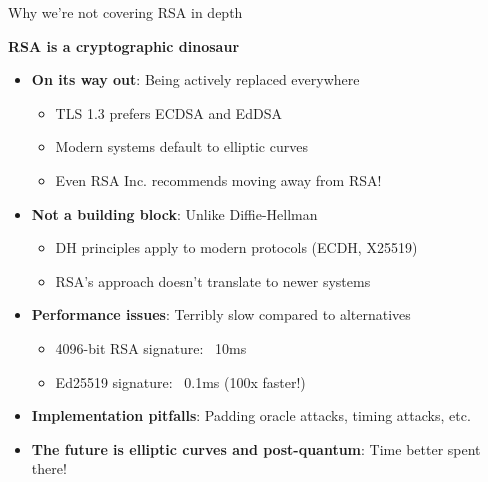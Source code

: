\documentclass[aspectratio=169, lualatex, handout]{beamer}
\begin{document}
\begin{frame}{Why we're not covering RSA in depth}
	\begin{center}
		\Large\textbf{RSA is a cryptographic dinosaur}
	\end{center}
	\vspace{0.25cm}
	\begin{itemize}[<+->]
		\item \textbf{On its way out}: Being actively replaced everywhere
		      \begin{itemize}
			      \item TLS 1.3 prefers ECDSA and EdDSA
			      \item Modern systems default to elliptic curves
			      \item Even RSA Inc. recommends moving away from RSA!
		      \end{itemize}
		\item \textbf{Not a building block}: Unlike Diffie-Hellman
		      \begin{itemize}
			      \item DH principles apply to modern protocols (ECDH, X25519)
			      \item RSA's approach doesn't translate to newer systems
		      \end{itemize}
		\item \textbf{Performance issues}: Terribly slow compared to alternatives
		      \begin{itemize}
			      \item 4096-bit RSA signature: ~10ms
			      \item Ed25519 signature: ~0.1ms (100x faster!)
		      \end{itemize}
		\item \textbf{Implementation pitfalls}: Padding oracle attacks, timing attacks, etc.
		\item \textbf{The future is elliptic curves and post-quantum}: Time better spent there!
	\end{itemize}
\end{frame}

\begin{frame}[plain]
	\titlepage
\end{frame}
\end{document}
